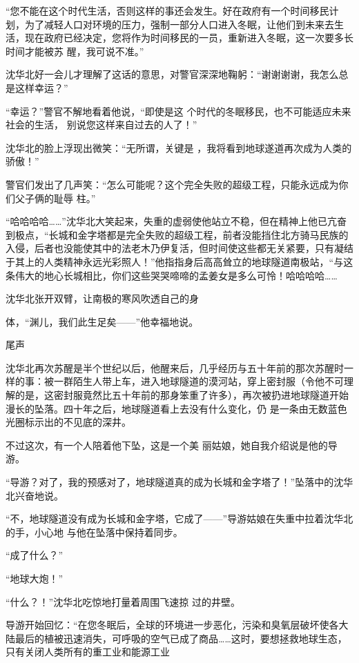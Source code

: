 \documentclass{article}
\begin{document}
“您不能在这个时代生活，否则这样的事还会发生。好在政府有一个时间移民计划，为了减轻人口对环境的压力，强制一部分人口进入冬眠，让他们到未来去生活，现在政府已经决定，您将作为时间移民的一员，重新进入冬眠，这一次要多长时间才能被苏
醒，我可说不准。” 

沈华北好一会儿才理解了这话的意思，对警官深深地鞠躬：“谢谢谢谢，我怎么总是这样幸运？”

“幸运？”警官不解地看着他说，“即使是这
\newpage
个时代的冬眠移民，也不可能适应未来社会的生活，
别说您这样来自过去的人了！” 

沈华北的脸上浮现出微笑：“无所谓，关键是
，我将看到地球遂道再次成为人类的骄傲！” 

警官们发出了几声笑：“怎么可能呢？这个完全失败的超级工程，只能永远成为你们父子俩的耻辱
柱。” 

“哈哈哈哈……”沈华北大笑起来，失重的虚弱使他站立不稳，但在精神上他已亢奋到极点，“长城和金字塔都是完全失败的超级工程，前者没能挡住北方骑马民族的入侵，后者也没能使其中的法老木乃伊复活，但时间使这些都无关紧要，只有凝结于其上的人类精神永远光彩照人！”他指指身后高高耸立的地球隧道南极站，“与这条伟大的地心长城相比，你们这些哭哭啼啼的孟姜女是多么可怜！哈哈哈哈……

沈华北张开双臂，让南极的寒风吹透自己的身

\newpage
体，“渊儿，我们此生足矣——”他幸福地说。 


尾声 

沈华北再次苏醒是半个世纪以后，他醒来后，几乎经历与五十年前的那次苏醒时一样的事：被一群陌生人带上车，进入地球隧道的漠河站，穿上密封服（令他不可理解的是，这密封服竟然比五十年前的那身笨重了许多），再次被扔进地球隧道开始漫长的坠落。四十年之后，地球隧道看上去没有什么变化，仍
是一条由无数蓝色光圈标示出的不见底的深井。 

不过这次，有一个人陪着他下坠，这是一个美
丽姑娘，她自我介绍说是他的导游。 

“导游？对了，我的预感对了，地球隧道真的成为长城和金字塔了！”坠落中的沈华北兴奋地说。

“不，地球隧道没有成为长城和金字塔，它成了——”导游姑娘在失重中拉着沈华北的手，小心地
与他在坠落中保持着同步。 

\newpage


“成了什么？” 


“地球大炮！” 

“什么？！”沈华北吃惊地打量着周围飞速掠
过的井壁。 

导游开始回忆：“在您冬眠后，全球的环境进一步恶化，污染和臭氧层破坏使各大陆最后的植被迅速消失，可呼吸的空气已成了商品……这时，要想拯救地球生态，只有关闭人类所有的重工业和能源工业
\end{document}
